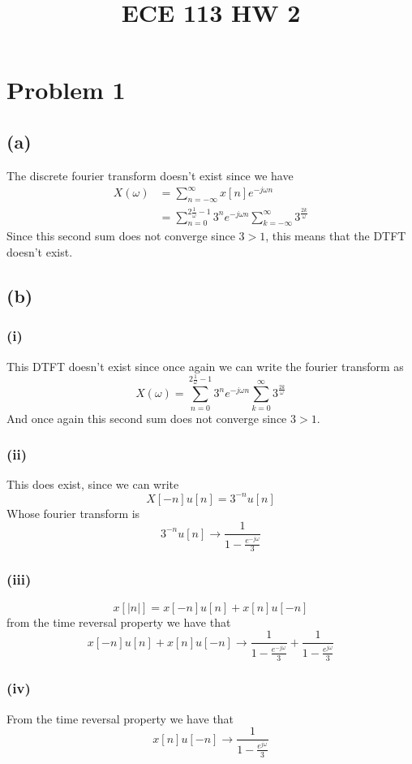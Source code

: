 
\title{ECE 113 HW 2}

\maketitle
\section*{Problem 1}
\subsection*{(a)}
The discrete fourier transform doesn't exist since we have
\begin{align*}
    X(\omega)&=\sum_{n=-\infty}^\infty x[n]e^{-j\omega n}\\
    &=\sum_{n=0}^{2\frac{1}{\omega}-1}3^{n}e^{-j\omega n}\sum_{k=-\infty}^{\infty}3^{\frac{2k}{\omega}}
\end{align*}
Since this second sum does not converge since $3>1$, this means that
the DTFT doesn't exist.
\subsection*{(b)}
\subsubsection*{(i)}
This DTFT doesn't exist since once again we can write the fourier transform
as 
$$X(\omega)=\sum_{n=0}^{2\frac{1}{\omega}-1}3^{n}e^{-j\omega n}\sum_{k=0}^{\infty}3^{\frac{2k}{\omega}}$$
And once again this second sum does not converge since $3>1$.
\subsubsection*{(ii)}
This does exist, since we can write 
$$X[-n]u[n]=3^{-n}u[n]$$
Whose fourier transform is 
$$3^{-n}u[n]\to \frac{1}{1-\frac{e^{-j\omega}}{3}}$$
\subsubsection*{(iii)}
$$x[|n|]=x[-n]u[n]+x[n]u[-n]$$
from the time reversal property we have that
$$x[-n]u[n]+x[n]u[-n]\to \frac{1}{1-\frac{e^{-j\omega}}{3}}+\frac{1}{1-\frac{e^{j\omega}}{3}}$$
\subsubsection*{(iv)}
From the time reversal property we have that
$$x[n]u[-n]\to\frac{1}{1-\frac{e^{j\omega}}{3}}$$
